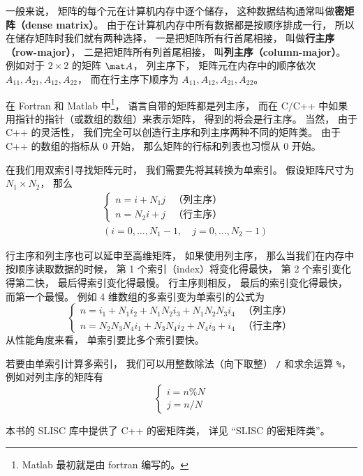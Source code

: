 

一般来说， 矩阵的每个元在计算机内存中逐个储存， 这种数据结构通常叫做\textbf{密矩阵（dense matrix）}。 由于在计算机内存中所有数据都是按顺序排成一行， 所以在储存矩阵时我们就有两种选择， 一是把矩阵所有行首尾相接， 叫做\textbf{行主序（row-major）}， 二是把矩阵所有列首尾相接， 叫\textbf{列主序（column-major）}。 例如对于 $2 \times 2$ 的矩阵 $\mat A$， 列主序下， 矩阵元在内存中的顺序依次 $A_{11}, A_{21}, A_{12}, A_{22}$， 而在行主序下顺序为 $A_{11},A_{12},A_{21},A_{22}$。

在 Fortran 和 Matlab 中\footnote{Matlab 最初就是由 fortran 编写的。}， 语言自带的矩阵都是列主序， 而在 C/C++ 中如果用指针的指针（或数组的数组）来表示矩阵， 得到的将会是行主序。 当然， 由于 C++ 的灵活性， 我们完全可以创造行主序和列主序两种不同的矩阵类。 由于 C++ 的数组的指标从 0 开始， 那么矩阵的行标和列表也习惯从 0 开始。

在我们用双索引寻找矩阵元时， 我们需要先将其转换为单索引。 假设矩阵尺寸为 $N_1 \times N_2$， 那么
\begin{equation}
\begin{aligned}
&\begin{cases}
n = i + N_1 j  &\text{（列主序）}\\
n = N_2 i + j  &\text{（行主序）}
\end{cases}\\
&(i = 0, \dots, N_1-1,\quad j = 0, \dots, N_2-1)
\end{aligned}
\end{equation}

行主序和列主序也可以延申至高维矩阵， 如果使用列主序， 那么当我们在内存中按顺序读取数据的时候， 第 1 个索引（index）将变化得最快， 第 2 个索引变化得第二快， 最后得索引变化得最慢。 行主序则相反， 最后的索引变化得最快， 而第一个最慢。 例如 4 维数组的多索引变为单索引的公式为
\begin{equation}
\begin{cases}
n = i_1 + N_1 i_2 + N_1 N_2 i_3 + N_1 N_2 N_3 i_4  &\text{（列主序）}\\
n = N_2 N_3 N_4 i_1 + N_3 N_4 i_2 + N_4 i_3 + i_4  &\text{（行主序）}
\end{cases}
\end{equation}
从性能角度来看， 单索引要比多个索引要快。

若要由单索引计算多索引， 我们可以用整数除法（向下取整） \verb|/| 和求余运算 \verb|%|， 例如对列主序的矩阵有
\begin{equation}
\begin{cases}
i = n \% N\\
j = n / N
\end{cases}
\end{equation}

本书的 SLISC 库中提供了 C++ 的密矩阵类， 详见 “SLISC 的密矩阵类”。
